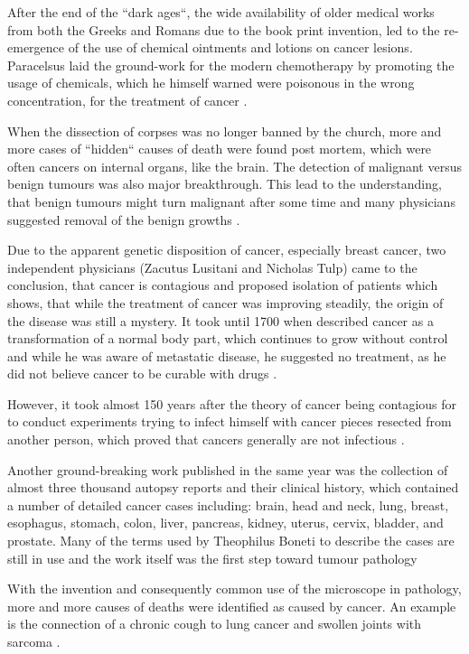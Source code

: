 After the end of the ``dark ages``, the wide availability of older medical works from both the Greeks and Romans due to the book print invention, led to the re-emergence of the use of chemical ointments and lotions on cancer lesions. Paracelsus laid the ground-work for the modern chemotherapy by promoting the usage of chemicals, which he himself warned were poisonous in the wrong concentration, for the treatment of cancer \cite{PHT1562}.

When the dissection of corpses was no longer banned by the church, more and more cases of ``hidden`` causes of death were found post mortem, which were often cancers on internal organs, like the brain. The detection of malignant versus benign tumours was also major breakthrough. This lead to the understanding, that  benign tumours might turn malignant after some time and many physicians suggested removal of the benign growths \cite{Severino1632}.

Due to the apparent genetic disposition of cancer, especially breast cancer, two independent physicians (Zacutus Lusitani and Nicholas Tulp) came to the conclusion, that cancer is contagious and proposed isolation of patients \cite{Lusitani1649,Tulpii1652} which shows, that while the treatment of cancer was improving steadily, the origin of the disease was still a mystery. It took until 1700 when \citeauthor{DeshaiesGendron1701} described cancer as a transformation of a normal body part, which continues to grow without control and while he was aware of metastatic disease, he suggested no treatment, as he did not believe cancer to be curable with drugs \cite{DeshaiesGendron1701}. 

However, it took almost 150 years after the theory of cancer being contagious for \citeauthor{Nooth1804} to conduct experiments trying to infect himself with cancer pieces resected from another person, which proved that cancers generally are not infectious \cite{Nooth1804}.

Another ground-breaking work published in the same year was the collection of almost three thousand autopsy reports and their clinical history, which contained a number of detailed cancer cases including: brain, head and neck, lung, breast, esophagus, stomach, colon, liver, pancreas, kidney, uterus, cervix, bladder, and prostate. Many of the terms used by Theophilus Boneti to describe the cases are still in use and the work itself was the first step toward tumour pathology \cite{Hajdu2010a}

With the invention and consequently common use of the microscope in pathology, more and more causes of deaths were identified as caused by cancer. An example is the connection of a chronic cough to lung cancer and swollen joints with sarcoma \cite{Etmueller2018}.

